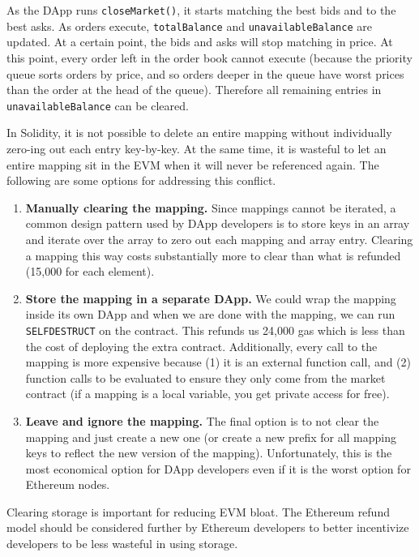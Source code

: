 As the DApp runs \texttt{closeMarket()}, it starts matching the best bids and to the best asks. As orders execute, \texttt{totalBalance} and \texttt{unavailableBalance} are updated. At a certain point, the bids and asks will stop matching in price. At this point, every order left in the order book cannot execute (because the priority queue sorts orders by price, and so orders deeper in the queue have worst prices than the order at the head of the queue). Therefore all remaining entries in \texttt{unavailableBalance} can be cleared.

In Solidity, it is not possible to delete an entire mapping without individually zero-ing out each entry key-by-key. At the same time, it is wasteful to let an entire mapping sit in the EVM when it will never be referenced again. The following are some options for addressing this conflict.

\begin{enumerate}

\item \textbf{Manually clearing the mapping.} Since mappings cannot be iterated, a common design pattern used by DApp developers is to store keys in an array and iterate over the array to zero out each mapping and array entry. Clearing a mapping this way costs substantially more to clear than what is refunded (15,000 for each element).

\item \textbf{Store the mapping in a separate DApp.} We could wrap the mapping inside its own DApp and when we are done with the mapping, we can run \texttt{SELFDESTRUCT} on the contract. This refunds us 24,000 gas which is less than the cost of deploying the extra contract. Additionally, every call to the mapping is more expensive because (1) it is an external function call, and (2) function calls  to be evaluated to ensure they only come from the market contract (if a mapping is a local variable, you get private access for free). 

\item \textbf{Leave and ignore the mapping.} The final option is to not clear the mapping and just create a new one (or create a new prefix for all mapping keys to reflect the new version of the mapping). Unfortunately, this is the most economical option for DApp developers even if it is the worst option for Ethereum nodes. 

\end{enumerate}

Clearing storage is important for reducing EVM bloat. The Ethereum refund model should be considered further by Ethereum developers to better incentivize developers to be less wasteful in using storage. 

